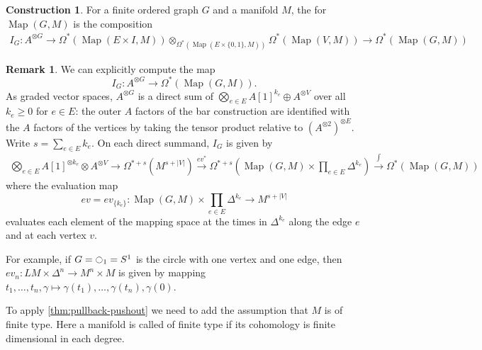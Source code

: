 \documentclass{scrartcl}
\let\emph\relax
\theoremstyle{plain}
\theoremstyle{definition}
\newtheorem{remark}[theorem]{Remark}
\newtheorem{construction}[theorem]{Construction}
\let\xto\xrightarrow
\DeclareMathOperator{\Map}{Map}
\newcommand{\Prod}{\prod}
\begin{document}
\begin{construction}
    For a finite ordered graph $G$ and a manifold $M$, the \emph{iterated integral map} for $\Map(G, M)$ is the composition
    \begin{align*}
        I_G\colon A^ {\otimes G}\to\Omega^*(\Map(E\times I, M))\otimes_{\Omega^*(\Map(E\times\{0,1\}, M))} \Omega^*(\Map(V, M)) \to \Omega^*(\Map(G, M))
    \end{align*}
\end{construction}

\begin{remark}
    We can explicitly compute the map $$I_G\colon A^{\otimes G}\to \Omega^*(\Map(G, M)).$$ As graded vector spaces, $A^{\otimes G}$ is a direct sum of $\bigotimes_{e\in E} A[1]^{k_e}\oplus A^{\otimes V}$ over all $k_e\geq 0$ for $e\in E$: the outer $A$ factors of the bar construction are identified with the $A$ factors of the vertices by taking the tensor product relative to $(A^{\otimes 2})^{\otimes E}$. Write $s=\sum_{e\in E} k_e$. On each direct summand, $I_G$ is given by 
\begin{align*}
    \bigotimes_{e\in E} A[1]^{\otimes k_e} \otimes A^{\otimes V} \to \Omega^{*+s}\left(M^{s+|V|}\right)\xto{ev^*} \Omega^{*+s}\left(\Map(G, M) \times \Prod_{e\in E} \Delta^{k_e}\right) \xto{\int} \Omega^*(\Map(G, M))
\end{align*}
where the evaluation map $$ev=ev_{\{k_e\}}\colon \Map(G, M)\times \Prod_{e\in E} \Delta^{k_e} \to  M^{s+|V|}$$ evaluates each element of the mapping space at the times in $\Delta^{k_e}$ along the edge $e$ and at each vertex $v$. 

For example, if $G=\ocircle_1=S^1$ is the circle with one vertex and one edge, then $ev_n\colon LM\times \Delta^n\to M^n\times M$ is given by mapping $t_1,\dots, t_n, \gamma\mapsto \gamma(t_1),\dots,\gamma(t_n), \gamma(0)$.
\end{remark}

To apply \cref{thm:pullback-pushout} we need to add the assumption that $M$ is of finite type. Here a manifold is called of finite type if its cohomology is finite dimensional in each degree. 
\end{document}
